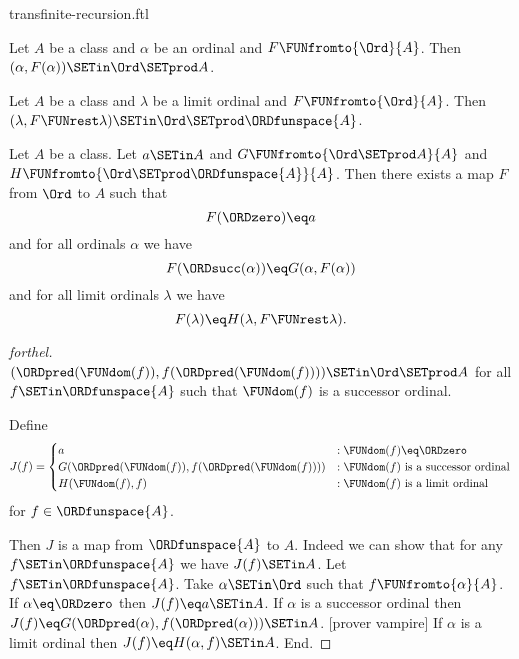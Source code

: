 \documentclass{stex}
\begin{document}
\begin{smodule}{transfinite-recursion.ftl}
\begin{lemma}[forthel,id=transfinite_recursion_029348573987483]
  Let $A$ be a class and $\alpha$ be an ordinal and $F \FUNfromto{\Ord}{A}$.
  Then $(\alpha, F(\alpha)) \SETin \Ord \SETprod A$.
\end{lemma}

\begin{lemma}[forthel,id=transfinite_recursion_570293857449281]
  Let $A$ be a class and $\lambda$ be a limit ordinal and $F \FUNfromto{\Ord}{A}$.
  Then $(\lambda, F \FUNrest \lambda) \SETin \Ord \SETprod \ORDfunspace{A}$.
\end{lemma}

\begin{corollary}[forthel,id=transfinite_recursion_298647309184593]
  Let $A$ be a class.
  Let $a \SETin A$ and $G \FUNfromto{\Ord \SETprod A}{A}$ and $H \FUNfromto{\Ord \SETprod \ORDfunspace{A}}{A}$.
  Then there exists a map $F$ from $\Ord$ to $A$ such that
  \[ F(\ORDzero) \eq a \]
  and for all ordinals $\alpha$ we have
  \[ F(\ORDsucc(\alpha)) \eq G(\alpha, F(\alpha)) \]
  and for all limit ordinals $\lambda$ we have
  \[ F(\lambda) \eq H(\lambda, F \FUNrest \lambda). \]
\end{corollary}
\begin{proof}[forthel]
  $(\ORDpred(\FUNdom(f)), f(\ORDpred(\FUNdom(f)))) \SETin \Ord \SETprod A$ for all $f \SETin \ORDfunspace{A}$ such that $\FUNdom(f)$ is a successor ordinal.

  Define  \[ J(f) =
    \begin{cases}
      a
      & : \FUNdom(f) \eq \ORDzero
      \\
      G(\ORDpred(\FUNdom(f)), f(\ORDpred(\FUNdom(f))))
      & : \text{$\FUNdom(f)$ is a successor ordinal}
      \\
      H(\FUNdom(f), f)
      & : \text{$\FUNdom(f)$ is a limit ordinal}
    \end{cases} \]
  for $f \in \ORDfunspace{A}$.

  Then $J$ is a map from $\ORDfunspace{A}$ to $A$.
  Indeed we can show that for any $f \SETin \ORDfunspace{A}$ we have $J(f) \SETin A$.
    Let $f \SETin \ORDfunspace{A}$.
    Take $\alpha \SETin \Ord$ such that $f \FUNfromto{\alpha}{A}$.
    If $\alpha \eq \ORDzero$ then $J(f) \eq a \SETin A$.
    If $\alpha$ is a successor ordinal then $J(f) \eq
    G(\ORDpred(\alpha), f(\ORDpred(\alpha))) \SETin A$.
    [prover vampire]
    If $\alpha$ is a limit ordinal then $J(f) \eq H(\alpha, f) \SETin A$.
  End.


\end{proof}
\end{smodule}
\end{document}

